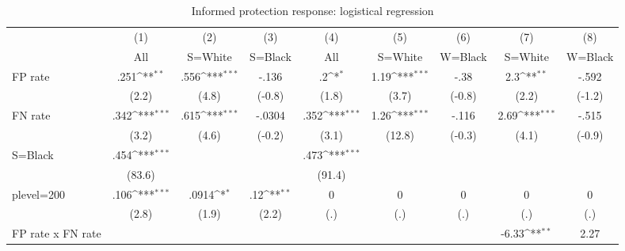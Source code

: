 \begin{table}[htbp]\centering
\footnotesize
\def\sym#1{\ifmmode^{#1}\else\(^{#1}\)\fi}
\caption{Informed protection response: logistical regression}
\begin{tabular}{l*{8}{c}}
\hline\hline
                &\multicolumn{1}{c}{(1)}&\multicolumn{1}{c}{(2)}&\multicolumn{1}{c}{(3)}&\multicolumn{1}{c}{(4)}&\multicolumn{1}{c}{(5)}&\multicolumn{1}{c}{(6)}&\multicolumn{1}{c}{(7)}&\multicolumn{1}{c}{(8)}\\
                &\multicolumn{1}{c}{All}&\multicolumn{1}{c}{S=White}&\multicolumn{1}{c}{S=Black}&\multicolumn{1}{c}{All}&\multicolumn{1}{c}{S=White}&\multicolumn{1}{c}{W=Black}&\multicolumn{1}{c}{S=White}&\multicolumn{1}{c}{W=Black}\\
\hline
FP rate         &     .251\sym{**} &     .556\sym{***}&    -.136         &       .2\sym{*}  &     1.19\sym{***}&     -.38         &      2.3\sym{**} &    -.592         \\
                &    (2.2)         &    (4.8)         &   (-0.8)         &    (1.8)         &    (3.7)         &   (-0.8)         &    (2.2)         &   (-1.2)         \\
FN rate         &     .342\sym{***}&     .615\sym{***}&   -.0304         &     .352\sym{***}&     1.26\sym{***}&    -.116         &     2.69\sym{***}&    -.515         \\
                &    (3.2)         &    (4.6)         &   (-0.2)         &    (3.1)         &   (12.8)         &   (-0.3)         &    (4.1)         &   (-0.9)         \\
S=Black         &     .454\sym{***}&                  &                  &     .473\sym{***}&                  &                  &                  &                  \\
                &   (83.6)         &                  &                  &   (91.4)         &                  &                  &                  &                  \\
plevel=200      &     .106\sym{***}&    .0914\sym{*}  &      .12\sym{**} &        0         &        0         &        0         &        0         &        0         \\
                &    (2.8)         &    (1.9)         &    (2.2)         &      (.)         &      (.)         &      (.)         &      (.)         &      (.)         \\
FP rate x FN rate&                  &                  &                  &                  &                  &                  &    -6.33\sym{**} &     2.27         \\

\end{tabular}
\end{table}

